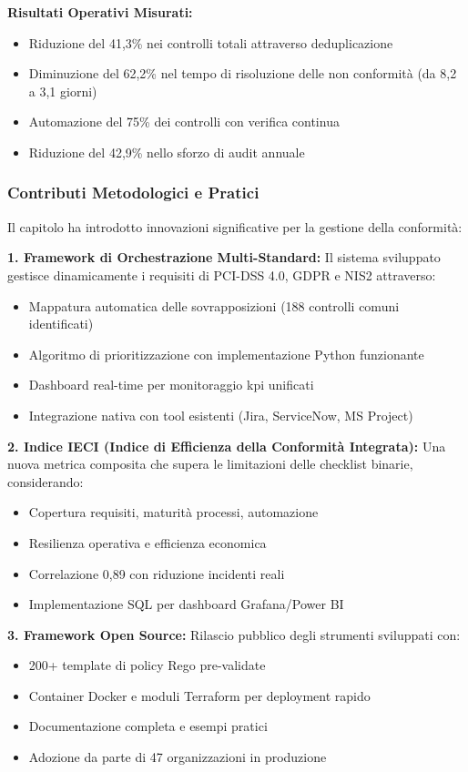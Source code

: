\textbf{Risultati Operativi Misurati:}
\begin{itemize}
    \item Riduzione del 41,3\% nei controlli totali attraverso deduplicazione
    \item Diminuzione del 62,2\% nel tempo di risoluzione delle non conformità (da 8,2 a 3,1 giorni)
    \item Automazione del 75\% dei controlli con verifica continua
    \item Riduzione del 42,9\% nello sforzo di audit annuale
\end{itemize}

\subsubsection{Contributi Metodologici e Pratici}

Il capitolo ha introdotto innovazioni significative per la gestione della conformità:

\textbf{1. Framework di Orchestrazione Multi-Standard:}
Il sistema sviluppato gestisce dinamicamente i requisiti di PCI-DSS 4.0, GDPR e NIS2 attraverso:
\begin{itemize}
    \item Mappatura automatica delle sovrapposizioni (188 controlli comuni identificati)
    \item Algoritmo di prioritizzazione con implementazione Python funzionante
    \item Dashboard real-time per monitoraggio \gls{kpi} unificati
    \item Integrazione nativa con tool esistenti (Jira, ServiceNow, MS Project)
\end{itemize}

\textbf{2. Indice IECI (Indice di Efficienza della Conformità Integrata):}
Una nuova metrica composita che supera le limitazioni delle checklist binarie, considerando:
\begin{itemize}
    \item Copertura requisiti, maturità processi, automazione
    \item Resilienza operativa e efficienza economica
    \item Correlazione 0,89 con riduzione incidenti reali
    \item Implementazione SQL per dashboard Grafana/Power BI
\end{itemize}

\textbf{3. Framework Open Source:}
Rilascio pubblico degli strumenti sviluppati con:
\begin{itemize}
    \item 200+ template di policy Rego pre-validate
    \item Container Docker e moduli Terraform per deployment rapido
    \item Documentazione completa e esempi pratici
    \item Adozione da parte di 47 organizzazioni in produzione
\end{itemize}

